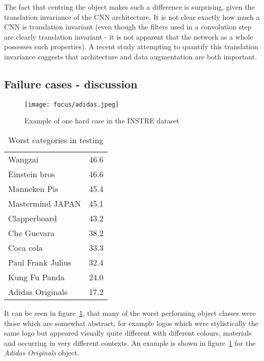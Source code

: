 The fact that centring the object makes such a difference is surprising, given the translation invariance of the CNN architecture. It is not clear exactly how much a CNN is translation invariant (even though the filters used in a convolution step are clearly translation invariant - it is not apparent that the network as a whole possesses such properties). A recent study attempting to quantify this translation invariance \cite{EricKauderer-Abrams2016} suggests that architecture and data augmentation are both important. 


\subsection {Failure cases - discussion}


\begin{figure}[t]
\centering
\texttt{[image: focus/adidas.jpeg]}
\caption{Example of one hard case in the INSTRE dataset}
\label{fig:focus_adidas}
\end{figure}



\begin{table}[h]
\centering
\caption{Worst categories in testing }
\begin{tabular}{ l l }
  \toprule 
  Wangzai & 46.6 \\
  Einstein bros & 46.6\\
  Manneken Pis & 45.4\\
  Mastermind JAPAN & 45.1\\
  Clapperboard & 43.2\\
  Che Guevara & 38.2\\
  Coca cola & 33.3\\
  Paul Frank Julius & 32.4\\
  Kung Fu Panda & 24.0\\
  Adidas Originals & 17.2\\
  \bottomrule
\end{tabular}
\label{fig:focus_failure}
\end{table}

It can be seen in figure~\ref{fig:focus_failure}, that many of the worst performing object classes were those which are somewhat abstract, for example logos which were stylistically the same logo but appeared visually quite different with different colours, materials and occurring in very different contexts. An example is shown in figure~\ref{fig:focus_adidas} for the \emph{Adidas Originals} object.

